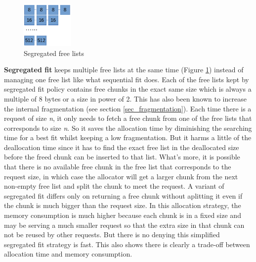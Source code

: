 \documentclass{acm_proc_article-sp}
\begin{document}
\begin{figure}[htbp]
\centering
\includegraphics[width=1in]{fig2}
\caption{Segregated free lists}\label{fig_2}
\end{figure}
\textbf{Segregated fit} keeps multiple free lists at the same time (Figure \ref{fig_2}) instead of managing one free list like what sequential fit does. Each of the free lists kept by segregated fit policy contains free chunks in the exact same size which is always a multiple of 8 bytes or a size in power of 2. This has also been known to increase the internal fragmentation (see section \ref{sec_fragmentation}). Each time there is a request of size \emph{n}, it only needs to fetch a free chunk from one of the free lists that corresponds to size \emph{n}. So it saves the allocation time by diminishing the searching time for a best fit whilst keeping a low fragmentation. But it harms a little of the deallocation time since it has to find the exact free list in the deallocated size before the freed chunk can be inserted to that list. What's more, it is possible that there is no available free chunk in the free list that corresponds to the request size, in which case the allocator will get a larger chunk from the next non-empty free list and split the chunk to meet the request. A variant of segregated fit differs only on returning a free chunk without aplitting it even if the chunk is much bigger than the request size. In this allocation strategy, the memory consumption is much higher because each chunk is in a fixed size and may be serving a much smaller request so that the extra size in that chunk can not be reused by other requests. But there is no denying this simplified segregated fit strategy is fast. This also shows there is clearly a trade-off between allocation time and memory consumption.
\end{document}
